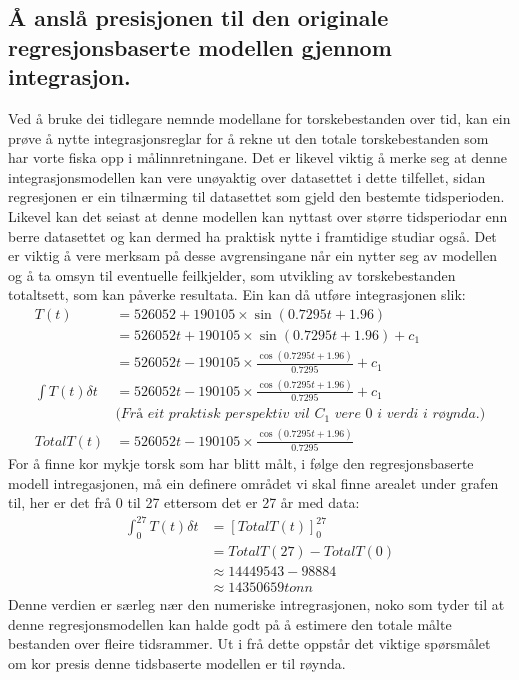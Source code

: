\documentclass{report}
\begin{document}
\subsection{Å anslå presisjonen til den originale regresjonsbaserte modellen gjennom integrasjon.}
Ved å bruke dei tidlegare nemnde modellane for torskebestanden over tid, kan ein prøve å nytte integrasjonsreglar for å rekne ut den totale torskebestanden som har vorte fiska opp i målinnretningane.
Det er likevel viktig å merke seg at denne integrasjonsmodellen kan vere unøyaktig over datasettet i dette tilfellet, sidan regresjonen er ein tilnærming til datasettet som gjeld den bestemte tidsperioden.
Likevel kan det seiast at denne modellen kan nyttast over større tidsperiodar enn berre datasettet og kan dermed ha praktisk nytte i framtidige studiar også.
Det er viktig å vere merksam på desse avgrensingane når ein nytter seg av modellen og å ta omsyn til eventuelle feilkjelder, som utvikling av torskebestanden totaltsett, som kan påverke resultata.
Ein kan då utføre integrasjonen slik:
\begin{align*}
	T(t)              & = 526052+190105\times \sin(0.7295t+1.96)                                  \\
	                  & = 526052t+190105\times\sin(0.7295t+1.96)+c_{1}                            \\
	                  & = 526052t-190105\times\frac{\cos(0.7295t+1.96)}{0.7295}+c_{1}             \\
	\int T(t)\delta t & =526052t-190105\times\frac{\cos(0.7295t+1.96)}{0.7295}+c_{1}              \\
	                  & \textit{(Frå eit praktisk perspektiv vil $C_1$ vere 0 i verdi i røynda.)} \\
	TotalT(t)         & =526052t-190105\times\frac{\cos(0.7295t+1.96)}{0.7295}
\end{align*}
For å finne kor mykje torsk som har blitt målt, i følge den regresjonsbaserte modell intregasjonen, må ein definere området vi skal finne arealet under grafen til, her er det frå 0 til 27 ettersom det er 27 år med data:
\begin{align*}
	\int_{0}^{27}T(t) \delta t & = [TotalT(t)]_{0}^{27} \\
	                           & = TotalT(27)-TotalT(0) \\
	                           & \approx 14449543-98884 \\
	                           & \approx 14350659tonn
\end{align*}
Denne verdien er særleg nær den numeriske intregrasjonen, noko som tyder til at denne regresjonsmodellen kan halde godt på å estimere den totale målte bestanden over fleire tidsrammer.
Ut i frå dette oppstår det viktige spørsmålet om kor presis denne tidsbaserte modellen er til røynda.
\end{document}
